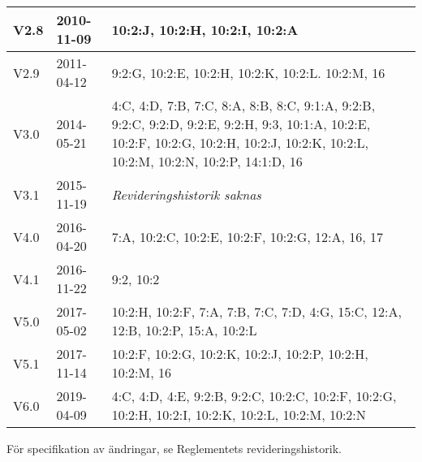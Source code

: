 \documentclass[10pt]{article}
\begin{document}
\begin{center}
\begin{tabular}{| l | l | p{10cm} |}
    \hline
    V2.8 & 2010-11-09 & 10:2:J, 10:2:H, 10:2:I, 10:2:A\\
    \hline
    V2.9 & 2011-04-12 & 9:2:G, 10:2:E, 10:2:H, 10:2:K, 10:2:L. 10:2:M, 16 \\
    \hline
    V3.0 & 2014-05-21 &  4:C, 4:D, 7:B, 7:C, 8:A, 8:B, 8:C, 9:1:A, 9:2:B, 9:2:C, 9:2:D, 9:2:E, 9:2:H, 9:3, 10:1:A, 10:2:E, 10:2:F, 10:2:G, 10:2:H, 10:2:J, 10:2:K, 10:2:L, 10:2:M, 10:2:N, 10:2:P, 14:1:D, 16\\
    \hline
    V3.1 & 2015-11-19 & \emph{Revideringshistorik saknas} \\
    \hline
    V4.0 & 2016-04-20 & 7:A, 10:2:C, 10:2:E, 10:2:F, 10:2:G, 12:A, 16, 17 \\
    \hline
    V4.1 & 2016-11-22 & 9:2, 10:2 \\
    \hline
    V5.0 & 2017-05-02 & 10:2:H, 10:2:F, 7:A, 7:B, 7:C, 7:D, 4:G, 15:C, 12:A, 12:B, 10:2:P, 15:A, 10:2:L \\
    \hline
    V5.1 & 2017-11-14 & 10:2:F, 10:2:G, 10:2:K, 10:2:J, 10:2:P, 10:2:H, 10:2:M, 16 \\
    \hline
    V6.0 & 2019-04-09 & 4:C, 4:D, 4:E, 9:2:B, 9:2:C, 10:2:C, 10:2:F, 10:2:G, 10:2:H, 10:2:I, 10:2:K, 10:2:L, 10:2:M, 10:2:N \\
   \hline
\end{tabular}
\end{center}
För specifikation av ändringar, se Reglementets revideringshistorik.
\end{document}
